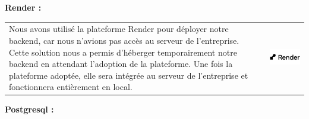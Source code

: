 \documentclass{article}
\begin{document}
\noindent \large \textbf{Render \cite{render}:}

\vspace{0,3cm}

\noindent
\begin{tabular}
{@{}m{}@{\hspace{1em}}m{}@{}}


\hspace{0,2cm}Nous avons utilisé la plateforme Render pour déployer notre backend, car nous n’avions pas accès au serveur de l’entreprise. Cette solution nous a permis d’héberger temporairement notre backend en attendant l’adoption de la plateforme. Une fois la plateforme adoptée, elle sera intégrée au serveur de l’entreprise et fonctionnera entièrement en local.

&
\includegraphics[width=\linewidth]{render.png} %
\end{tabular}


\vspace{0,8cm}

\noindent \large \textbf {Postgresql \cite{postgresql}:}

\vspace{0,3cm}
\end{document}
